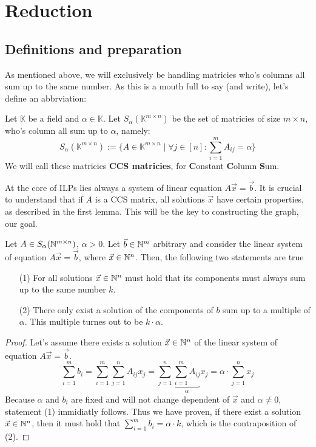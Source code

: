 \section{Reduction}
\subsection{Definitions and preparation}
As mentioned above, we will exclusively be handling matricies who's columns all sum up to the same number. As this is a mouth full to say (and write), let's define an abbrviation:

\begin{definition}
    \label{def:CCS}
    Let $\mathbb{K}$ be a field and $\alpha \in \mathbb{K}$. Let $S_{\alpha}(\mathbb{K}^{m \times n})$ be the set of matricies of size $m \times n$, who's column all sum up to $\alpha$, namely:
    $$S_{\alpha}(\mathbb{K}^{m \times n}) := \{A \in \mathbb{K}^{m \times n}\mid \forall j \in [n]\colon \sum_{i=1}^{m} A_{ij} = \alpha\}$$
    We will call these matricies \textbf{CCS matricies}, for \textbf{C}onstant \textbf{C}olumn \textbf{S}um.
\end{definition}

At the core of ILPs lies always a system of linear equation $A \vec x = \vec b$. It is crucial to understand that if $A$ is a CCS matrix, all solutions $\vec x$ have certain properties, as described in the first lemma. This will be the key to constructing the graph, our goal. 

\begin{lemma}
    \label{lemma:ilp_pre1}
    Let $A\in S_\alpha(\mathbb{N}^{m \times n})$, $\alpha > 0$. Let $\vec b \in \mathbb{N}^m$ arbitrary and consider the linear system of equation $A\vec x=\vec b$, where $\vec x \in \mathbb{N}^n$. Then, the following two statements are true

    \begin{enumerate}
        \item[(1)] For all solutions $\vec x \in \mathbb{N}^n$ must hold that its components must always sum up to the same number $k$.
        \item[(2)] There only exist a solution of the components of $b$ sum up to a multiple of $\alpha$. This multiple turnes out to be $k \cdot \alpha$.
    \end{enumerate}
\end{lemma}

\begin{proof}
    Let's assume there exists a solution $\vec x \in \mathbb{N}^n$ of the linear system of equation $A\vec x=\vec b$.
    $$\sum_{i=1}^m b_i = \sum_{i=1}^{m}\sum_{j=1}^{n}A_{ij} x_j = \sum_{j=1}^{n}\underbrace{\sum_{i=1}^{m}A_{ij}}_\alpha x_j = \alpha \cdot \sum_{j=1}^{n}x_j$$
    Because $\alpha$ and $b_i$ are fixed and will not change dependent of $\vec x$ and $\alpha \neq 0$, statement (1) immidiatly follows. Thus we have proven, if there exist a solution $\vec x \in \mathbb{N}^n$, then it must hold that $\sum_{i=1}^{m}b_i = \alpha \cdot k$, which is the contraposition of (2).
\end{proof}



